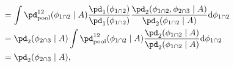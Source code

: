 \begin{align}
  &=
    \int
      \pd_{\text{pool}}^{12}(\phi_{1 \cap 2} \mid A)
      \frac {
        \pd_{1}(\phi_{1 \cap 2})
      } {
        \pd_{1}(\phi_{1 \cap 2})
      }
      \frac {
        \pd_{2}(\phi_{1 \cap 2}, \phi_{2 \cap 3} \mid A)
      } {
        \pd_{2}(\phi_{1 \cap 2} \mid A)
      }
    \text{d} \phi_{1 \cap 2} 
    \\
  &=
    \pd_{2}(\phi_{2 \cap 3} \mid A)
    \int
       \pd_{\text{pool}}^{12}(\phi_{1 \cap 2} \mid A)
       \frac {
        \pd_{2}(\phi_{1 \cap 2} \mid A)
       } {
        \pd_{2}(\phi_{1 \cap 2} \mid A)
       }
    \text{d} \phi_{1 \cap 2}
    \\
  &= 
    \pd_{2}(\phi_{2 \cap 3} \mid A),
  \label{eqn:conditional-commutativity-two}
\end{align}